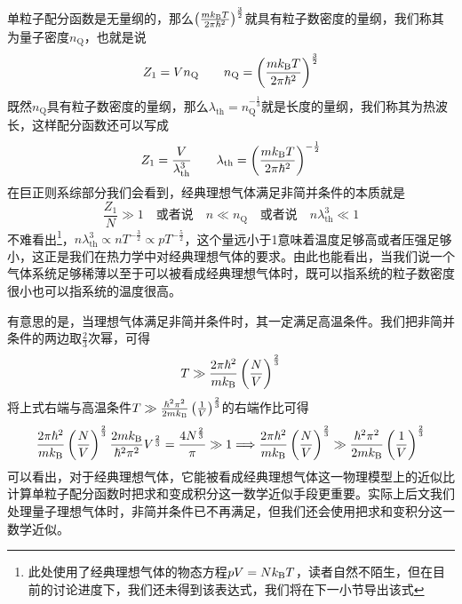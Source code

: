 \documentclass[../../main.tex]{subfiles}
\begin{document}
单粒子配分函数是无量纲的，那么\(\left(\frac{mk_{\mathrm{B}} T}{2\pi\hbar^2}\right)^{\frac{3}{2}}\)就具有粒子数密度的量纲，我们称其为量子密度\(n_{\text{Q}}\)，也就是说
\begin{equation}
    Z_1=Vn_{\text{Q}}\qquad n_{\text{Q}}=\left(\frac{mk_{\mathrm{B}} T}{2\pi\hbar^2}\right)^{\frac{3}{2}}
\end{equation}
既然\(n_{\text{Q}}\)具有粒子数密度的量纲，那么\(\lambda_{\text{th}}=n_{\text{Q}}^{-\frac{1}{3}}\)就是长度的量纲，我们称其为热波长，这样配分函数还可以写成
\begin{equation}
    Z_1=\frac{V}{\lambda_{\text{th}}^3}\qquad \lambda_{\text{th}}=\left(\frac{mk_{\mathrm{B}} T}{2\pi\hbar^2}\right)^{-\frac{1}{2}}
\end{equation}
在巨正则系综部分我们会看到，经典理想气体满足非简并条件的本质就是
\begin{equation}
    \frac{Z_1}{N}\gg 1 \quad\text{或者说}\quad  n\ll n_{\text{Q}} \quad\text{或者说}\quad n\lambda_{\text{th}}^3\ll 1
\end{equation}
不难看出\footnote{此处使用了经典理想气体的物态方程\(pV=Nk_{\mathrm{B}} T\)，读者自然不陌生，但在目前的讨论进度下，我们还未得到该表达式，我们将在下一小节导出该式}，\(n\lambda_{\text{th}}^3\propto nT^{-\frac{3}{2}}\propto pT^{-\frac{5}{2}}\)，这个量远小于1意味着温度足够高或者压强足够小，这正是我们在热力学中对经典理想气体的要求。由此也能看出，当我们说一个气体系统足够稀薄以至于可以被看成经典理想气体时，既可以指系统的粒子数密度很小也可以指系统的温度很高。

有意思的是，当理想气体满足非简并条件时，其一定满足高温条件。我们把非简并条件的两边取\(\frac{2}{3}\)次幂，可得
\begin{equation}
    T\gg\frac{2\pi\hbar^2}{mk_{\mathrm{B}}}\left(\frac{N}{V}\right)^{\frac{2}{3}}
\end{equation}
将上式右端与高温条件\(T\gg \frac{\hbar^2\pi^2}{2mk_{\mathrm{B}}}\left(\frac{1}{V}\right)^{\frac{2}{3}}\)的右端作比可得
\begin{equation}
    \frac{2\pi\hbar^2}{mk_{\mathrm{B}}}\left(\frac{N}{V}\right)^{\frac{2}{3}}\frac{2mk_{\mathrm{B}}}{\hbar^2\pi^2}V^{\frac{2}{3}}=\frac{4N^{\frac{2}{3}}}{\pi}\gg 1\Longrightarrow \frac{2\pi\hbar^2}{mk_{\mathrm{B}}}\left(\frac{N}{V}\right)^{\frac{2}{3}}\gg \frac{\hbar^2\pi^2}{2mk_{\mathrm{B}}}\left(\frac{1}{V}\right)^{\frac{2}{3}}
\end{equation}
可以看出，对于经典理想气体，它能被看成经典理想气体这一物理模型上的近似比计算单粒子配分函数时把求和变成积分这一数学近似手段更重要。实际上后文我们处理量子理想气体时，非简并条件已不再满足，但我们还会使用把求和变积分这一数学近似。
\end{document}
